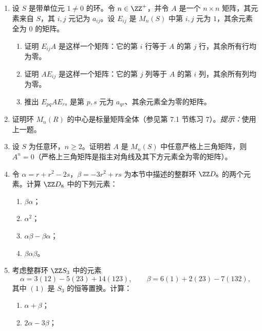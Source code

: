 \begin{enumerate}[label=\arabic*.]
\[	\]
	（$F((x))$ 的每个元素都是 $x$ 的幂级数加上 $1/x$ 的多项式，即负次幂项只有有限多个。）
	\begin{enumerate}[label=(\alph*)]
		\item 证明 $F((x))$ 是域。
		\item 定义映射
		\[
		v:F((x))^\times\to\ZZ,
		\qquad v\!\bigg(\sum_{n\geq N}a_nx^n\bigg)=N,
		\]
		其中 $a_N$ 是级数的第一个非零系数（即 $N$ 是该级数在 $0$ 处零点或极点的阶）。证明 $v$ 是 $F((x))$ 上的离散赋值，其离散赋值环是 $F[[x]]$（参见第 7.1 节练习 26）。
	\end{enumerate}
	\item 设 $S$ 是带单位元 $1\neq0$ 的环。令 $n\in\ZZ^+$，并令 $A$ 是一个 $n\times n$ 矩阵，其元素来自 $S$，其 $i,j$ 元记为 $a_{ij}$。设 $E_{ij}$ 是 $M_n(S)$ 中第 $i,j$ 元为 $1$，其余元素全为 $0$ 的矩阵。
	\begin{enumerate}[label=(\alph*)]
		\item 证明 $E_{ij}A$ 是这样一个矩阵：它的第 $i$ 行等于 $A$ 的第 $j$ 行，其余所有行均为零。
		\item 证明 $AE_{ij}$ 是这样一个矩阵：它的第 $j$ 列等于 $A$ 的第 $i$ 列，其余所有列均为零。
		\item 推出 $E_{pq}AE_{rs}$ 是第 $p,s$ 元为 $a_{qr}$、其余元素全为零的矩阵。
	\end{enumerate}
	\item 证明环 $M_n(R)$ 的中心是标量矩阵全体（参见第 7.1 节练习 7）。\emph{提示：}使用上一题。
	\item 设 $S$ 为任意环，$n\geq2$。证明若 $A$ 是 $M_n(S)$ 中任意严格上三角矩阵，则 $A^n=0$（严格上三角矩阵是指主对角线及其下方元素全为零的矩阵）。
	\item 令 $\alpha=r+r^2-2s$，$\beta=-3r^2+rs$ 为本节中描述的整群环 $\ZZ D_8$ 的两个元素。计算 $\ZZ D_8$ 中的下列元素：
	\begin{enumerate}[label=(\alph*)]
		\item $\beta\alpha$；
		\item $\alpha^2$；
		\item $\alpha\beta-\beta\alpha$；
		\item $\beta\alpha\beta$。
	\end{enumerate}
	\item 考虑整群环 $\ZZ S_3$ 中的元素
	\[
	\alpha=3(12)-5(23)+14(123),
	\qquad
	\beta=6(1)+2(23)-7(132),
	\]
	其中 $(1)$ 是 $S_3$ 的恒等置换。计算：
	\begin{enumerate}[label=(\alph*)]
		\item $\alpha+\beta$；
		\item $2\alpha-3\beta$；

\end{enumerate}
\end{enumerate}
